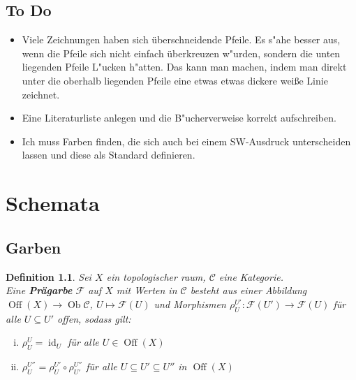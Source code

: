 \documentclass[paper = A4, fontsize=12pt, numbers=noendperiod, chapterprefix=true]{scrbook}
\theoremstyle{break}
\newtheorem{Def}{Definition}[section]
\theoremstyle{nonumberbreak}
\theoremstyle{nonumberplain}
\newcommand{\emp}[1]{\textbf{\emph{#1}}}
\newcommand{\deftermspec}[2]{{\index{#2}}\emp{#1}}
\DeclareMathOperator{\Off}{Off}
\DeclareMathOperator{\Ob}{Ob}
\DeclareMathOperator{\id}{id}
\begin{document}
\section*{To Do}\begin{itemize}
\item
  Viele Zeichnungen haben sich \"uberschneidende Pfeile. Es s"ahe besser aus, wenn die Pfeile sich nicht einfach \"uberkreuzen w"urden, sondern die unten liegenden Pfeile L"ucken h"atten. Das kann man machen, indem man direkt unter die oberhalb liegenden Pfeile eine etwas etwas dickere wei\ss e Linie zeichnet.
\item
	Eine Literaturliste anlegen und die B"ucherverweise korrekt aufschreiben.
\item
	Ich muss Farben finden, die sich auch bei einem SW-Ausdruck unterscheiden lassen und diese als Standard definieren.
\end{itemize}


\chapter{Schemata}

\section{Garben}

\begin{Def}
Sei $X$ ein topologischer raum, $\mathcal C$ eine Kategorie.\\
Eine \deftermspec{Pr\"agarbe}{Garbe!Pr\"a-} $\mathcal F$ auf $X$ mit Werten in $\mathcal C$ besteht aus einer Abbildung $\Off(X) \to \Ob \mathcal C$, $U \mapsto \mathcal F(U)$ und Morphismen $\rho_U^{U'}: \mathcal F(U') \to \mathcal F(U)$ f\"ur alle $U\subseteq U'$ offen, sodass gilt:
\begin{enumerate}[i)]
\item
  $\rho_U^U = \id_U$ f\"ur alle $U\in \Off(X)$
\item
  $\rho_U^{U''} = \rho_U^{U'} \circ \rho_{U'}^{U''}$ f\"ur alle $U\subseteq U' \subseteq U''$ in $\Off(X)$
\end{enumerate}\end{Def}
\end{document}
